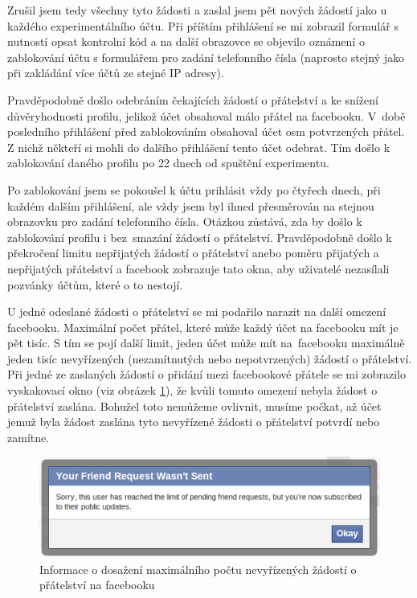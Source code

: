 \documentclass[thesis=M,czech]{FITthesis}[2013/05/10]
\begin{document}
Zrušil jsem tedy všechny tyto žádosti a zaslal jsem pět nových žádostí jako u každého experimentálního účtu. Při příštím přihlášení se mi zobrazil formulář s nutností opsat kontrolní kód a na další obrazovce se objevilo oznámení o zablokování účtu s formulářem pro zadání telefonního čísla (naprosto stejný jako při zakládání více účtů ze stejné IP adresy).

Pravděpodobně došlo odebráním čekajících žádostí o přátelství a ke snížení důvěryhodnosti profilu, jelikož účet obsahoval málo přátel na facebooku. V~době posledního přihlášení před zablokováním obsahoval účet osm potvrzených přátel. Z nichž někteří si mohli do dalšího přihlášení tento účet odebrat. Tím došlo k zablokování daného profilu po 22 dnech od spuštění experimentu. 

Po zablokování jsem se pokoušel k účtu prihlásit vždy po čtyřech dnech, při každém dalším přihlášení, ale vždy jsem byl ihned přesměrován na stejnou obrazovku pro zadání telefonního čísla. Otázkou zůstává, zda by došlo k zablokování profilu i bez~smazání žádostí o přátelství. Pravděpodobně došlo k překročení limitu nepřijatých žádostí o přátelství anebo poměru přijatých a nepřijatých přátelství a facebook zobrazuje tato okna, aby uživatelé nezasílali pozvánky účtům, které o to nestojí.

U jedné odeslané žádosti o přátelství se mi podařilo narazit na další omezení facebooku. Maximální počet přátel, které může každý účet na facebooku mít je pět tisíc. S tím se pojí další limit, jeden účet může mít na~facebooku maximálně jeden tisíc nevyřízených (nezamítnutých nebo nepotvrzených) žádostí o přátelství. Při jedné ze zaslaných žádostí o přidání mezi facebookové přátele se mi zobrazilo vyskakovací okno (viz obrázek \ref{fig:friendRequestsLimitReached}), že kvůli tomuto omezení nebyla žádost o přátelství zaslána. Bohužel toto nemůžeme ovlivnit, musíme počkat, až účet jemuž byla žádost zaslána tyto nevyřízené žádosti o přátelství potvrdí nebo zamítne.

\begin{figure}[h]
\begin{center}
\includegraphics[width=5in]{figures/friendRequestsLimitReached.png}
\caption{Informace o dosažení maximálního počtu nevyřízených žádostí o přátelství na facebooku}
\label{fig:friendRequestsLimitReached}
\end{center}
\end{figure}
\end{document}
